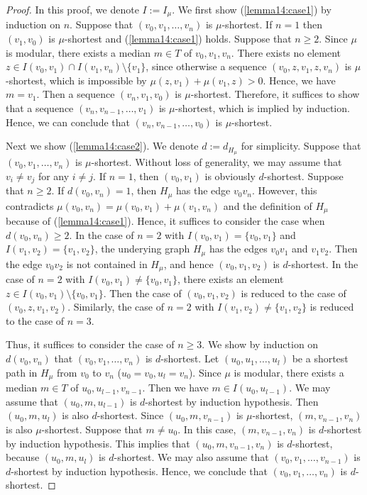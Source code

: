 \documentclass[11pt]{article}
\theoremstyle{definition}
\begin{document}
\begin{proof}
In this proof, we denote $I:=I_\mu$. We first show (\ref{lemma14:case1}) by induction on $n$. Suppose that $(v_0,v_1,\ldots,v_n)$ is $\mu$-shortest. If $n=1$ then $(v_1,v_0)$ is $\mu$-shortest and (\ref{lemma14:case1}) holds. Suppose that $n\geq 2$. Since $\mu$ is modular, there exists a median $m\in T$ of $v_0,v_1,v_n$. There exists no element $z\in I(v_0,v_1)\cap I(v_1,v_n)\setminus \{v_1\}$, since otherwise a sequence $(v_0,z,v_1,z,v_n)$ is $\mu$-shortest, which is impossible by $\mu(z,v_1)+\mu(v_1,z)>0$. Hence, we have $m=v_1$. Then a sequence $(v_n,v_1,v_0)$ is $\mu$-shortest. Therefore, it suffices to show that a sequence $(v_n,v_{n-1},\ldots,v_1)$ is $\mu$-shortest, which is implied by induction. Hence, we can conclude that $(v_n,v_{n-1},\ldots,v_0)$ is $\mu$-shortest.


Next we show (\ref{lemma14:case2}). We denote $d:=d_{H_\mu}$ for simplicity. Suppose that $(v_0,v_1,\ldots,v_n)$ is $\mu$-shortest. Without loss of generality, we may assume that $v_i\neq v_j$ for any $i\neq j$. If $n=1$, then $(v_0,v_1)$ is obviously $d$-shortest. Suppose that $n\geq 2$. If $d(v_0,v_n)=1$, then $H_\mu$ has the edge $v_0v_n$. However, this contradicts $\mu(v_0,v_n)=\mu(v_0,v_1)+\mu(v_1,v_n)$ and the definition of $H_\mu$ because of (\ref{lemma14:case1}). Hence, it suffices to consider the case when $d(v_0,v_n)\geq 2$. In the case of $n=2$ with $I(v_0,v_1)=\{v_0,v_1\}$ and $I(v_1,v_2)=\{v_1,v_2\}$, the underying graph $H_\mu$ has the edges $v_0v_1$ and $v_1v_2$. Then the edge $v_0v_2$ is not contained in $H_\mu$, and hence $(v_0,v_1,v_2)$ is $d$-shortest. In the case of $n=2$ with $I(v_0,v_1)\neq \{v_0,v_1\}$, there exists an element $z\in I(v_0,v_1)\setminus \{v_0,v_1\}$. Then the case of $(v_0,v_1,v_2)$ is reduced to the case of $(v_0,z,v_1,v_2)$. Similarly, the case of $n=2$ with $I(v_1,v_2)\neq \{v_1,v_2\}$ is reduced to the case of $n=3$. 

Thus, it suffices to consider the case of $n\geq 3$. We show by induction on $d(v_0,v_n)$ that $(v_0,v_1,\ldots,v_n)$ is $d$-shortest. Let
$(u_0,u_1,\ldots,u_l)$ be a shortest path in $H_\mu$ from $v_0$ to $v_n$ ($u_0=v_0,u_l=v_n$). Since $\mu$ is modular, there exists a median $m\in T$ of $u_0,u_{l-1},v_{n-1}$. Then we have $m\in I(u_0,u_{l-1})$. We may assume that $(u_0,m,u_{l-1})$ is $d$-shortest by induction hypothesis. Then $(u_0,m,u_l)$ is also $d$-shortest. Since $(u_0,m,v_{n-1})$ is $\mu$-shortest, $(m,v_{n-1},v_n)$ is also $\mu$-shortest. Suppose that $m\neq u_0$. In this case, $(m,v_{n-1},v_n)$ is $d$-shortest by induction hypothesis. This implies that $(u_0,m,v_{n-1},v_n)$ is $d$-shortest, because $(u_0,m,u_l)$ is $d$-shortest. We may also assume that $(v_0,v_1,\ldots,v_{n-1})$ is $d$-shortest by induction hypothesis. Hence, we conclude that  $(v_0,v_1,\ldots,v_{n})$ is $d$-shortest. 


\end{proof}
\end{document}
